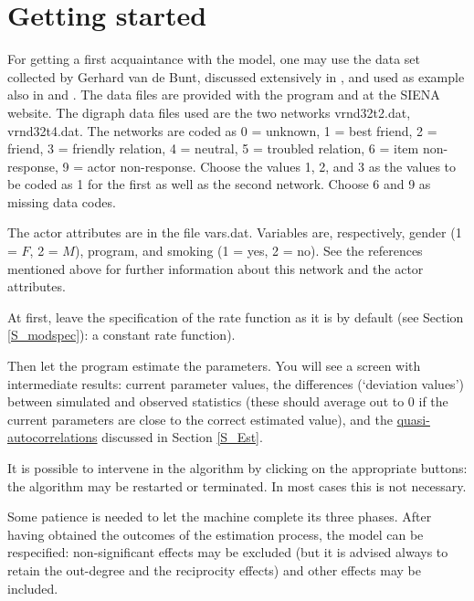 \documentclass[a4paper,fleqn]{article}
\newcommand{\+}{\, + \,}
\newcommand{\SI}{{\sf SIENA }}
\begin{document}
{\begin{print}
\newpage
\end{print}
\section{Getting started}
\label{S_getting}

For getting a first acquaintance with the model, one may use the
data set collected by Gerhard van de Bunt, discussed extensively in
\citet*{vanBunt99, vanBuntEA99},
and used as example also in \citet{Snijders01} and \citet{Snijders05}.
The data files are provided with the program
and at the \SI website. The digraph data files
used are the two networks {\sf vrnd32t2.dat}, {\sf vrnd32t4.dat}.
The networks are coded as 0 = unknown, 1 = best friend, 2 = friend,
3 = friendly relation, 4 = neutral, 5 = troubled relation, 6 = item
non-response, 9 = actor non-response.
Choose the values 1, 2, and 3 as the values to be coded
as 1 for the first as well as the second network. Choose 6 and 9 as
missing data codes.

The actor attributes are in the file {\sf vars.dat}. Variables
are, respectively, gender (1 = $F$, 2 = $M$), program, and smoking
(1 = yes, 2 = no). See the references mentioned above for further
information about this network and the actor attributes.

At first, leave the specification of the rate function as
it is by default (see Section \ref{S_modspec}):
a constant rate function).

Then let the program estimate the parameters. You will see a
screen with intermediate results: current parameter values, the
differences (`deviation values') between simulated and observed
statistics (these should average out to 0 if the current
parameters are close to the correct estimated value), and the
\hyperlink{T_quasiac}{quasi-autocorrelations} discussed in Section
\ref{S_Est}.

It is possible to intervene in the algorithm by clicking on the
appropriate buttons: %
the algorithm may be restarted or terminated. In most cases
this is not necessary.

\begin{screen}
\newpage
\end{screen}
Some patience is needed to let the machine complete its three
phases.
After having obtained the outcomes of the estimation
process, the model can be respecified: non-significant effects may
be excluded (but it is advised always to retain the out-degree and
the reciprocity effects) and other effects may be included.

}
\end{document}
